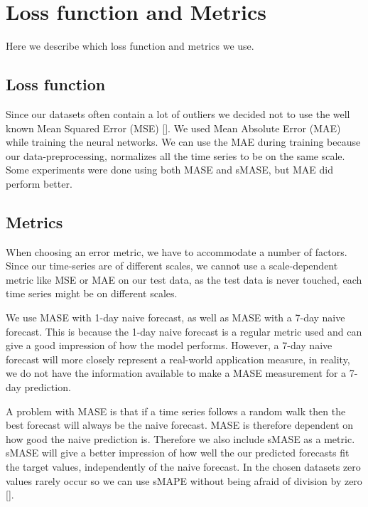 
\section{Loss function and Metrics}
\label{section:Method:Metrics}

Here we describe which loss function and metrics we use.

\subsection*{Loss function}
Since our datasets often contain a lot of outliers we decided not to use the well known
Mean Squared Error (MSE) [].
We used Mean Absolute Error (MAE) while training the neural networks. We can use the MAE during training because our data-preprocessing,
normalizes all the time series to be on the same scale.
Some experiments were done using both MASE and sMASE, but MAE did perform better.

\subsection*{Metrics}
When choosing an error metric, we have to accommodate a number of factors.
Since our time-series are of different scales, we cannot use a scale-dependent metric
like MSE or MAE on our test data, as the test data is never touched, each time series might be on different scales.

We use MASE with 1-day naive forecast, as well as MASE with a 7-day
naive forecast. This is because the 1-day naive forecast is a regular metric used
and can give a good impression of how the model performs.
However, a 7-day naive forecast will more closely represent a real-world application measure,
in reality, we do not have the information available to make a MASE measurement for a 7-day prediction.

A problem with MASE is that if a time series follows a random walk
then the best forecast will always be the naive forecast. MASE is therefore dependent on
how good the naive prediction is.
Therefore we also include sMASE as a metric.
sMASE will give a better impression of how well the our predicted forecasts fit the target values,
independently of the naive forecast.
In the chosen datasets zero values rarely occur so we can use sMAPE without
being afraid of division by zero [].

